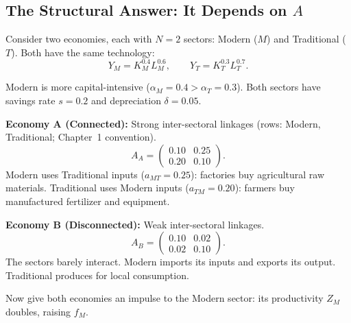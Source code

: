 \documentclass[../structural_economics_book.tex]{subfiles}
\begin{document}
\subsection{The Structural Answer: It Depends on $A$}

\begin{example}\label{ch03:ex:two_WP}
Consider two economies, each with $N = 2$ sectors: Modern ($M$) and Traditional ($T$). Both have the same technology:
\begin{equation}
Y_M = K_M^{0.4} L_M^{0.6}, \qquad Y_T = K_T^{0.3} L_T^{0.7}.
\end{equation}

Modern is more capital-intensive ($\alpha_M = 0.4 > \alpha_T = 0.3$). Both sectors have savings rate $s = 0.2$ and depreciation $\delta = 0.05$.

\textbf{Economy A (Connected):} Strong inter-sectoral linkages (rows: Modern, Traditional; Chapter~1 convention).
\begin{equation}
A_A = \begin{pmatrix} 0.10 & 0.25 \\ 0.20 & 0.10 \end{pmatrix}.
\end{equation}
Modern uses Traditional inputs ($a_{MT} = 0.25$): factories buy agricultural raw materials. Traditional uses Modern inputs ($a_{TM} = 0.20$): farmers buy manufactured fertilizer and equipment.

\textbf{Economy B (Disconnected):} Weak inter-sectoral linkages.
\begin{equation}
A_B = \begin{pmatrix} 0.10 & 0.02 \\ 0.02 & 0.10 \end{pmatrix}.
\end{equation}
The sectors barely interact. Modern imports its inputs and exports its output. Traditional produces for local consumption.

Now give both economies an impulse to the Modern sector: its productivity $Z_M$ doubles, raising $f_M$.
\end{example}
\end{document}
